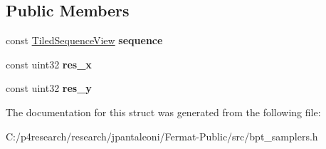 \subsection*{Public Members}
\begin{DoxyCompactItemize}
\item 
\mbox{\label{struct_per_pixel_eye_subpath_primary_coords_a01c5b417f7141a04f062586d28d328c5}} 
const \hyperlink{struct_tiled_sequence_view}{Tiled\+Sequence\+View} {\bfseries sequence}
\item 
\mbox{\label{struct_per_pixel_eye_subpath_primary_coords_aabe1c9d4b9bcb950c776d168a0ef4a83}} 
const uint32 {\bfseries res\+\_\+x}
\item 
\mbox{\label{struct_per_pixel_eye_subpath_primary_coords_aa529fe217bad21e144832d688eb71609}} 
const uint32 {\bfseries res\+\_\+y}
\end{DoxyCompactItemize}


The documentation for this struct was generated from the following file\+:\begin{DoxyCompactItemize}
\item 
C\+:/p4research/research/jpantaleoni/\+Fermat-\/\+Public/src/bpt\+\_\+samplers.\+h\end{DoxyCompactItemize}
